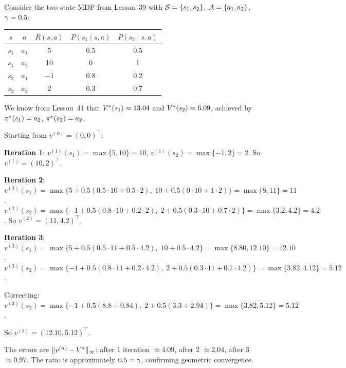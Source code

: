 \documentclass[11pt,a4paper]{article}
\begin{document}
\begin{example}
\label{ex:vi-two-state}
Consider the two-state MDP from Lesson~39 with
$\mathcal{S} = \{s_1, s_2\}$, $\mathcal{A} = \{a_1, a_2\}$,
$\gamma = 0.5$:
\begin{center}
\begin{tabular}{ccccc}
\toprule
$s$ & $a$ & $R(s,a)$ & $P(s_1 \mid s,a)$ & $P(s_2 \mid s,a)$ \\
\midrule
$s_1$ & $a_1$ & 5 & 0.5 & 0.5 \\
$s_1$ & $a_2$ & 10 & 0 & 1 \\
$s_2$ & $a_1$ & $-1$ & 0.8 & 0.2 \\
$s_2$ & $a_2$ & 2 & 0.3 & 0.7 \\
\bottomrule
\end{tabular}
\end{center}
We know from Lesson~41 that $V^*(s_1) \approx 13.04$ and
$V^*(s_2) \approx 6.09$, achieved by $\pi^*(s_1) = a_2$,
$\pi^*(s_2) = a_2$.

Starting from $v^{(0)} = (0, 0)^\top$:

\textbf{Iteration 1}: $v^{(1)}(s_1) = \max\{5, 10\} = 10$,
$v^{(1)}(s_2) = \max\{-1, 2\} = 2$. So $v^{(1)} = (10, 2)^\top$.

\textbf{Iteration 2}:
$v^{(2)}(s_1) = \max\{5 + 0.5(0.5 \cdot 10 + 0.5 \cdot 2),\;
10 + 0.5(0 \cdot 10 + 1 \cdot 2)\} = \max\{8, 11\} = 11$.
$v^{(2)}(s_2) = \max\{-1 + 0.5(0.8 \cdot 10 + 0.2 \cdot 2),\;
2 + 0.5(0.3 \cdot 10 + 0.7 \cdot 2)\} = \max\{3.2, 4.2\} = 4.2$.
So $v^{(2)} = (11, 4.2)^\top$.

\textbf{Iteration 3}:
$v^{(3)}(s_1) = \max\{5 + 0.5(0.5 \cdot 11 + 0.5 \cdot 4.2),\;
10 + 0.5 \cdot 4.2\} = \max\{8.80, 12.10\} = 12.10$.
$v^{(3)}(s_2) = \max\{-1 + 0.5(0.8 \cdot 11 + 0.2 \cdot 4.2),\;
2 + 0.5(0.3 \cdot 11 + 0.7 \cdot 4.2)\} = \max\{3.82, 4.12\}
= 5.12$.

Correcting: $v^{(3)}(s_2) = \max\{-1 + 0.5(8.8 + 0.84),\;
2 + 0.5(3.3 + 2.94)\} = \max\{3.82, 5.12\} = 5.12$.

So $v^{(3)} = (12.10, 5.12)^\top$.

The errors are $\|v^{(n)} - V^*\|_\infty$: after 1 iteration
$\approx 4.09$, after 2 $\approx 2.04$, after 3 $\approx 0.97$.
The ratio is approximately $0.5 = \gamma$, confirming geometric
convergence.
\end{example}

\end{document}
